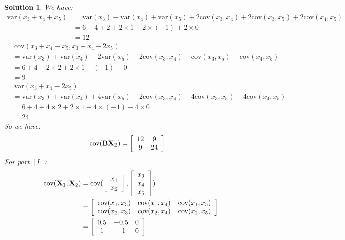 \documentclass[11pt]{article}\usepackage[]{graphicx}\usepackage[]{color}
\newtheorem{sol}{Solution}
\begin{document}
\begin{sol}
	We have:
	\begin{align*}
		\text{var}(x_3 + x_4 + x_5) &= \text{var}(x_3) +\text{var}(x_4) + \text{var}(x_5) + 2\text{cov}(x_3, x_4) + 2\text{cov}(x_3, x_5) + 2\text{cov}(x_4, x_5)\\
		&= 6 + 4 + 2 + 2\times 1 + 2\times (-1) + 2\times 0\\
		&= 12
	\end{align*}
	\begin{align*}
		&\ \text{cov}(x_3 + x_4 + x_5, x_3 + x_4 - 2x_5) \\
		&=\text{var}(x_3)+\text{var}(x_4)- 2\text{var}(x_5) + 2\text{cov}(x_3,x_4) - \text{cov}(x_3, x_5) - \text{cov}(x_4, x_5)\\
		&= 6 + 4 - 2\times 2 + 2\times 1 - (-1) - 0\\
		&= 9
	\end{align*}
	\begin{align*}
		&\ \text{var}(x_3 + x_4 - 2x_5) \\
		&= \text{var}(x_3) + \text{var}(x_4) + 4\text{var}(x_5) + 2\text{cov}(x_3,x_4) - 4\text{cov}(x_3,x_5) -4\text{cov}(x_4,x_5)\\
		&= 6 + 4 + 4\times2 + 2\times1 - 4\times(-1) - 4 \times 0\\
		&= 24
	\end{align*}
	So we have:
	\begin{align*}
	\text{cov}({\bf B}{\bf X}_2) &=\left[\begin{array}{cc} 12& 9\\9 &24\end{array} \right]
	\end{align*}
	For part $[I]$:
	\begin{align*}
		\text{cov}({\bf X}_1, {\bf X}_2) &= \text{cov}(\left[\begin{array}{c}x_1\\ x_2\end{array}\right],\left[\begin{array}{c}x_3\\ x_4\\ x_5\end{array}\right]) \\
		&= \left[\begin{array}{ccc} \text{cov}(x_1, x_3)&\text{cov}(x_1, x_4)&\text{cov}(x_1, x_5)\\ \text{cov}(x_2, x_3)&\text{cov}(x_2, x_4)& \text{cov}(x_2, x_5)\end{array}\right]\\
		&= \left[\begin{array}{ccc} 0.5&-0.5&0\\ 1&-1& 0\end{array}\right]

\end{align*}
\end{sol}
\end{document}
